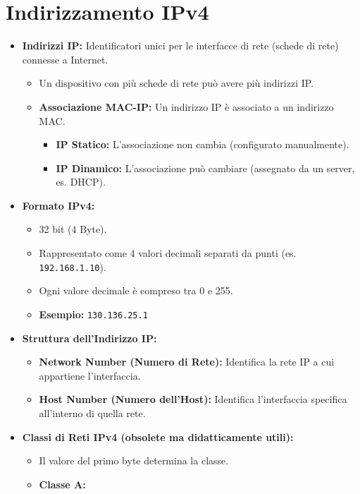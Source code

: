 \documentclass{article}
\begin{document}
\section{Indirizzamento IPv4}
\begin{itemize}
    \item \textbf{Indirizzi IP:} Identificatori unici per le interfacce di rete (schede di rete) connesse a Internet.
    \begin{itemize}
        \item Un dispositivo con più schede di rete può avere più indirizzi IP.
        \item \textbf{Associazione MAC-IP:} Un indirizzo IP è associato a un indirizzo MAC.
        \begin{itemize}
            \item \textbf{IP Statico:} L'associazione non cambia (configurato manualmente).
            \item \textbf{IP Dinamico:} L'associazione può cambiare (assegnato da un server, es. DHCP).
        \end{itemize}
    \end{itemize}
    \item \textbf{Formato IPv4:}
    \begin{itemize}
        \item 32 bit (4 Byte).
        \item Rappresentato come 4 valori decimali separati da punti (es. \texttt{192.168.1.10}).
        \item Ogni valore decimale è compreso tra 0 e 255.
        \item \textbf{Esempio:} \texttt{130.136.25.1}
    \end{itemize}
    \item \textbf{Struttura dell'Indirizzo IP:}
    \begin{itemize}
        \item \textbf{Network Number (Numero di Rete):} Identifica la rete IP a cui appartiene l'interfaccia.
        \item \textbf{Host Number (Numero dell'Host):} Identifica l'interfaccia specifica all'interno di quella rete.
    \end{itemize}
    \item \textbf{Classi di Reti IPv4 (obsolete ma didatticamente utili):}
    \begin{itemize}
        \item Il valore del primo byte determina la classe.
        \item \textbf{Classe A:}

\end{itemize}
\end{itemize}
\end{document}
